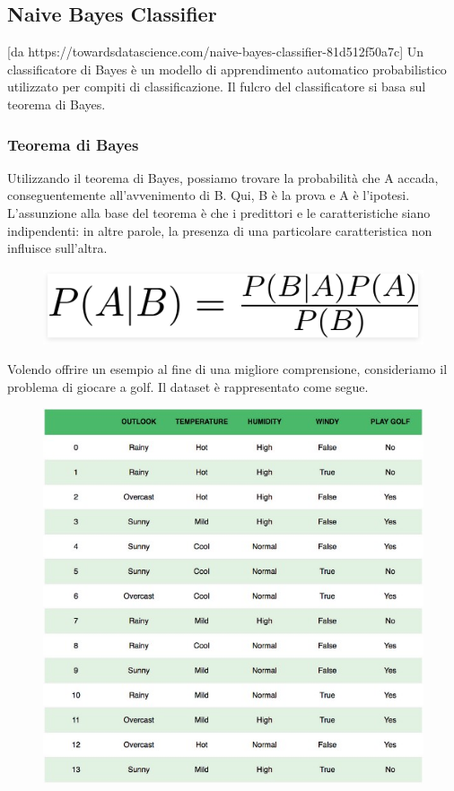 \subsection{Naive Bayes Classifier}
[da https://towardsdatascience.com/naive-bayes-classifier-81d512f50a7c]
Un classificatore di Bayes è un modello di apprendimento automatico probabilistico utilizzato per compiti di classificazione. Il fulcro del classificatore si basa sul teorema di Bayes.


\subsubsection{Teorema di Bayes}
Utilizzando il teorema di Bayes, possiamo trovare la probabilità che A accada, conseguentemente all’avvenimento di B. Qui, B è la prova e A è l'ipotesi. 
L'assunzione alla base del teorema è che i predittori e le caratteristiche siano indipendenti: in altre parole, la presenza di una particolare caratteristica non influisce sull'altra.
\begin{figure}
    \begin{center}    
        \includegraphics[width=0.9\linewidth]{images/image17.png}
    \end{center}
\end{figure}
Volendo oﬀrire un esempio al fine di una migliore comprensione, consideriamo il problema di giocare a golf.  Il dataset è rappresentato come segue.
\begin{figure}
    \begin{center}    
        \includegraphics[width=0.9\linewidth]{images/image18.jpeg}
    \end{center}
\end{figure}
